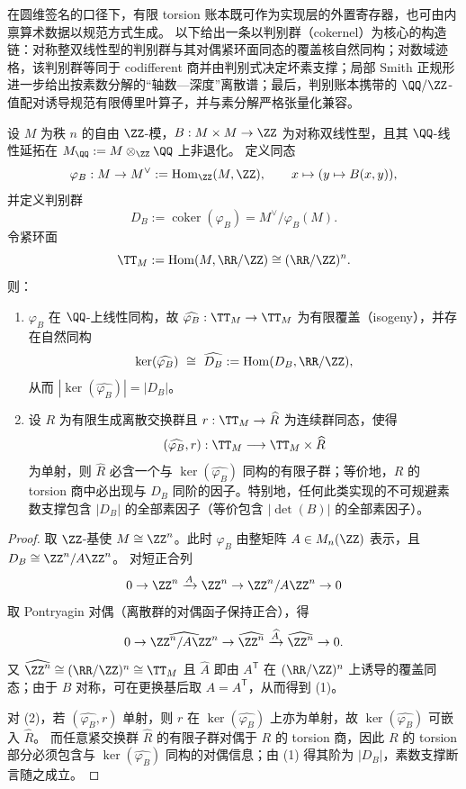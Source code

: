 在圆维签名的口径下，有限 torsion 账本既可作为实现层的外置寄存器，也可由内禀算术数据以规范方式生成。
以下给出一条以判别群（cokernel）为核心的构造链：对称整双线性型的判别群与其对偶紧环面同态的覆盖核自然同构；对数域迹格，该判别群等同于 codifferent 商并由判别式决定坏素支撑；局部 Smith 正规形进一步给出按素数分解的“轴数—深度”离散谱；最后，判别账本携带的 \(\QQ/\ZZ\)-值配对诱导规范有限傅里叶算子，并与素分解严格张量化兼容。

\begin{theorem}\label{thm:xi-disc-ledger-kernel-dual}
设 \(M\) 为秩 \(n\) 的自由 \(\ZZ\)-模，\(B:M\times M\to \ZZ\) 为对称双线性型，且其 \(\QQ\)-线性延拓在 \(M_{\QQ}:=M\otimes_{\ZZ}\QQ\) 上非退化。
定义同态
\[
\varphi_B:M\to M^\vee:=\operatorname{Hom}_{\ZZ}(M,\ZZ),\qquad
x\mapsto (y\mapsto B(x,y)),
\]
并定义判别群
\[
D_B:=\operatorname{coker}(\varphi_B)=M^\vee/\varphi_B(M).
\]
令紧环面
\[
\TT_M:=\operatorname{Hom}(M,\RR/\ZZ)\cong (\RR/\ZZ)^n.
\]
则：
\begin{enumerate}
  \item \(\varphi_B\) 在 \(\QQ\)-上线性同构，故 \(\widehat{\varphi_B}:\TT_M\to \TT_M\) 为有限覆盖（isogeny），并存在自然同构
  \[
  \ker(\widehat{\varphi_B})\ \cong\ \widehat{D_B}:=\operatorname{Hom}(D_B,\RR/\ZZ),
  \]
  从而 \(|\ker(\widehat{\varphi_B})|=|D_B|\)。
  \item 设 \(R\) 为有限生成离散交换群且 \(r:\TT_M\to \widehat R\) 为连续群同态，使得
  \[
  (\widehat{\varphi_B},r):\TT_M\longrightarrow \TT_M\times \widehat R
  \]
  为单射，则 \(\widehat R\) 必含一个与 \(\ker(\widehat{\varphi_B})\) 同构的有限子群；等价地，\(R\) 的 torsion 商中必出现与 \(D_B\) 同阶的因子。特别地，任何此类实现的不可规避素数支撑包含 \(|D_B|\) 的全部素因子（等价包含 \(|\det(B)|\) 的全部素因子）。
\end{enumerate}
\end{theorem}
\begin{proof}
取 \(\ZZ\)-基使 \(M\cong \ZZ^n\)。此时 \(\varphi_B\) 由整矩阵 \(A\in M_n(\ZZ)\) 表示，且
\(
D_B\cong \ZZ^n/A\ZZ^n
\)。
对短正合列
\[
0\to \ZZ^n \xrightarrow{A} \ZZ^n \to \ZZ^n/A\ZZ^n\to 0
\]
取 Pontryagin 对偶（离散群的对偶函子保持正合），得
\[
0\to \widehat{\ZZ^n/A\ZZ^n}\to \widehat{\ZZ^n}\xrightarrow{\widehat A}\widehat{\ZZ^n}\to 0.
\]
又 \(\widehat{\ZZ^n}\cong (\RR/\ZZ)^n\cong \TT_M\) 且 \(\widehat A\) 即由 \(A^{\mathsf T}\) 在 \((\RR/\ZZ)^n\) 上诱导的覆盖同态；由于 \(B\) 对称，可在更换基后取 \(A=A^{\mathsf T}\)，从而得到 (1)。
\par
对 (2)，若 \((\widehat{\varphi_B},r)\) 单射，则 \(r\) 在 \(\ker(\widehat{\varphi_B})\) 上亦为单射，故 \(\ker(\widehat{\varphi_B})\) 可嵌入 \(\widehat R\)。
而任意紧交换群 \(\widehat R\) 的有限子群对偶于 \(R\) 的 torsion 商，因此 \(R\) 的 torsion 部分必须包含与 \(\ker(\widehat{\varphi_B})\) 同构的对偶信息；由 (1) 得其阶为 \(|D_B|\)，素数支撑断言随之成立。
\end{proof}

